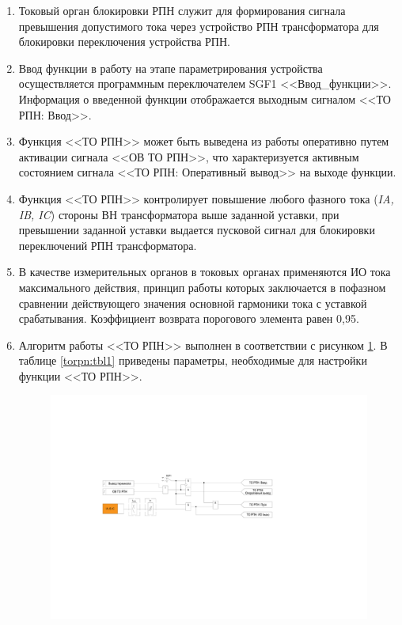 \documentclass[a4paper, 12pt,table, hidelinks, DIV=calc]{extarticle} %
\begin{document}
\begin{enumerate}[label=\arabic{section}.\arabic{subsection}.\arabic*, labelsep=4pt, leftmargin=0pt, itemindent=57pt]

\item
Токовый орган блокировки РПН служит для формирования сигнала превышения допустимого тока через устройство РПН трансформатора для блокировки переключения устройства РПН.
\item
Ввод функции в работу на этапе параметрирования устройства осуществляется программным переключателем SGF1 <<Ввод\_функции>>. Информация о введенной функции отображается выходным сигналом <<ТО РПН: Ввод>>.
\item
Функция <<ТО РПН>> может быть выведена из работы оперативно путем активации сигнала <<ОВ ТО РПН>>, что характеризуется активным состоянием сигнала <<ТО РПН: Оперативный вывод>> на выходе функции.
\item
Функция <<ТО РПН>> контролирует повышение любого фазного тока (\textsl{IA, IB, IC}) стороны ВН трансформатора выше заданной уставки, при превышении заданной уставки выдается пусковой сигнал для блокировки переключений РПН трансформатора.
\item
В качестве измерительных органов в токовых органах применяются ИО тока максимального действия, принцип работы которых заключается в пофазном сравнении действующего значения основной гармоники тока с уставкой срабатывания. Коэффициент возврата порогового элемента равен 0,95.

\item
Алгоритм работы <<ТО РПН>> выполнен в соответствии с рисунком \ref{torpn:img1}. В таблице \ref{torpn:tbl1} приведены параметры, необходимые для настройки функции <<ТО РПН>>.

\vspace{3mm}
\begin{figure}[!h]
\centering
\includegraphics[width=1\textwidth,height=1\textheight,keepaspectratio]{img19.pdf}
\label{torpn:img1}
\end{figure}


\end{enumerate}
\end{document}
